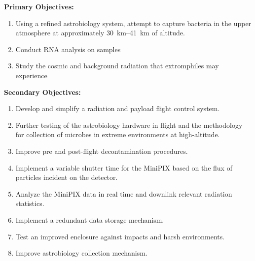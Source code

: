 {\bf Primary Objectives:}
	\begin{enumerate}
	\item Using a refined astrobiology system, attempt to capture bacteria in the upper atmosphere at approximately \SIrange{30}{41}{\kilo\meter} of altitude.
%	
%
	\item Conduct RNA analysis on samples
	\item Study the cosmic and background radiation that extromphiles may experience
	\end{enumerate}
%
%
{\bf Secondary Objectives:}
\begin{enumerate}
	\item Develop and simplify a radiation and payload flight control system.
	\item Further testing of the astrobiology hardware in flight and the methodology for collection of microbes in extreme environments at high-altitude. 
	\item Improve pre and post-flight decontamination procedures.
	\item Implement a variable shutter time for the MiniPIX based on the flux of particles incident on the detector.
	\item Analyze the MiniPIX data in real time and downlink relevant radiation statistics.
	\item Implement a redundant data storage mechanism.
	\item Test an improved enclosure against impacts and harsh environments.
	\item Improve astrobiology collection mechanism.
\end{enumerate}
